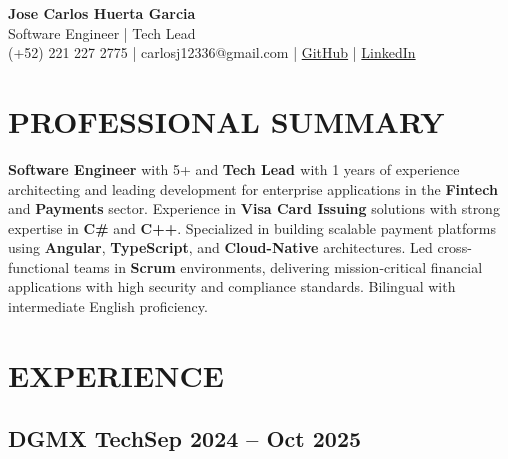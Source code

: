 \documentclass[a4paper,10pt]{article}
\newcommand{\kw}[1]{\textbf{\textcolor{keyword}{#1}}}
\begin{document}
\begin{center}
{\bfseries\LARGE Jose Carlos Huerta Garcia} \\
Software Engineer | Tech Lead \\
(+52) 221 227 2775 | carlosj12336@gmail.com | \href{https://github.com/jcarloshg}{GitHub} | \href{https://www.linkedin.com/in/jose-carlos-huerta-garcia-773952212}{LinkedIn}
\end{center}

\section*{PROFESSIONAL SUMMARY}
\kw{Software Engineer} with 5+ and \kw{Tech Lead } with 1 years of experience architecting and leading development for enterprise applications in the \kw{Fintech} and \kw{Payments} sector. Experience in \kw{Visa Card Issuing} solutions with strong expertise in \kw{C\#} and \kw{C++}. Specialized in building scalable payment platforms using \kw{Angular}, \kw{TypeScript}, and \kw{Cloud-Native} architectures. Led cross-functional teams in \kw{Scrum} environments, delivering mission-critical financial applications with high security and compliance standards. Bilingual with intermediate English proficiency.

\section*{EXPERIENCE}

\subsection*{\small DGMX Tech\hfill\textbf{Sep 2024 -- Oct 2025}}
\end{document}
